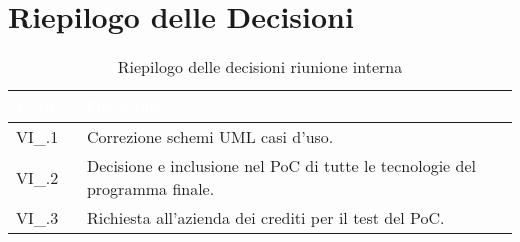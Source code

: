 \section{Riepilogo delle Decisioni}


\begin{table}[!htbp]
\renewcommand{\arraystretch}{1.5}
\begin{tabular}{m{}<{\centering}  m{}<{\centering}}
\rowcolor{darkblue} \textcolor{white}{\textbf{Codice}} & \textcolor{white}{\textbf{Decisione}} \\
\hline
VI\_\D{}.1 & Correzione schemi UML casi d'uso.\\
\rowcolor{gray!10} VI\_\D{}.2 & Decisione e inclusione nel PoC di tutte le tecnologie del programma finale.\\
VI\_\D{}.3 & Richiesta all'azienda dei crediti per il test del PoC.\\
\end{tabular}
\caption{Riepilogo delle decisioni riunione interna \D{}}
\end{table}